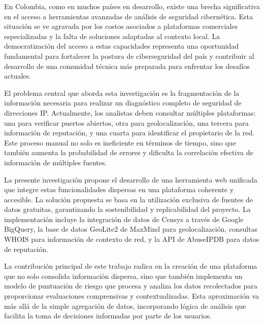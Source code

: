 En Colombia, como en muchos países en desarrollo, existe una brecha significativa en el acceso a herramientas avanzadas de análisis de seguridad cibernética. Esta situación se ve agravada por los costos asociados a plataformas comerciales especializadas y la falta de soluciones adaptadas al contexto local. La democratización del acceso a estas capacidades representa una oportunidad fundamental para fortalecer la postura de ciberseguridad del país y contribuir al desarrollo de una comunidad técnica más preparada para enfrentar los desafíos actuales.

El problema central que aborda esta investigación es la fragmentación de la información necesaria para realizar un diagnóstico completo de seguridad de direcciones IP. Actualmente, los analistas deben consultar múltiples plataformas: una para verificar puertos abiertos, otra para geolocalización, una tercera para información de reputación, y una cuarta para identificar el propietario de la red. Este proceso manual no solo es ineficiente en términos de tiempo, sino que también aumenta la probabilidad de errores y dificulta la correlación efectiva de información de múltiples fuentes.

La presente investigación propone el desarrollo de una herramienta web unificada que integre estas funcionalidades dispersas en una plataforma coherente y accesible. La solución propuesta se basa en la utilización exclusiva de fuentes de datos gratuitas, garantizando la sostenibilidad y replicabilidad del proyecto. La implementación incluye la integración de datos de Censys a través de Google BigQuery, la base de datos GeoLite2 de MaxMind para geolocalización, consultas WHOIS para información de contexto de red, y la API de AbuseIPDB para datos de reputación.

La contribución principal de este trabajo radica en la creación de una plataforma que no solo consolida información dispersa, sino que también implementa un modelo de puntuación de riesgo que procesa y analiza los datos recolectados para proporcionar evaluaciones comprensivas y contextualizadas. Esta aproximación va más allá de la simple agregación de datos, incorporando lógica de análisis que facilita la toma de decisiones informadas por parte de los usuarios.
